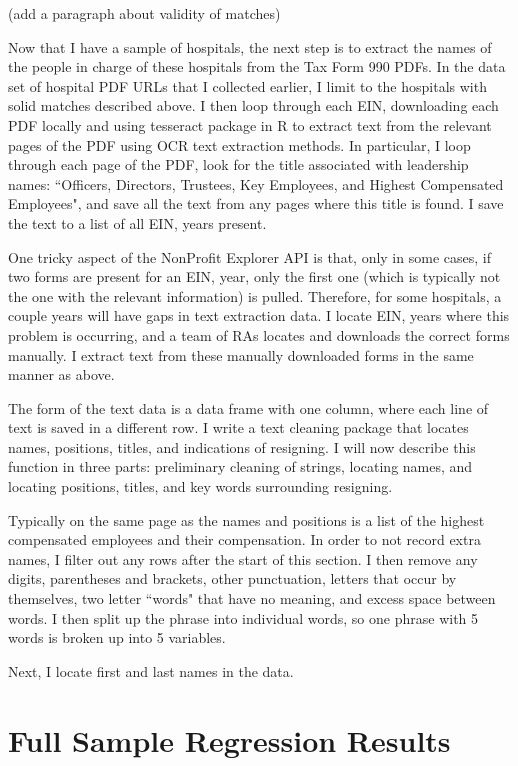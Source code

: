 \documentclass[12pt]{article}
\begin{document}
(add a paragraph about validity of matches)

 Now that I have a sample of hospitals, the next step is to extract the names of the people in charge of these hospitals from the Tax Form 990 PDFs. In the data set of hospital PDF URLs that I collected earlier, I limit to the hospitals with solid matches described above. I then loop through each EIN, downloading each PDF locally and using tesseract package in R to extract text from the relevant pages of the PDF using OCR text extraction methods. In particular, I loop through each page of the PDF, look for the title associated with leadership names: ``Officers, Directors, Trustees, Key Employees, and Highest Compensated Employees", and save all the text from any pages where this title is found. I save the text to a list of all EIN, years present. 

One tricky aspect of the NonProfit Explorer API is that, only in some cases, if two forms are present for an EIN, year, only the first one (which is typically not the one with the relevant information) is pulled. Therefore, for some hospitals, a couple years will have gaps in text extraction data. I locate EIN, years where this problem is occurring, and a team of RAs locates and downloads the correct forms manually. I extract text from these manually downloaded forms in the same manner as above. 

The form of the text data is a data frame with one column, where each line of text is saved in a different row. I write a text cleaning package that locates names, positions, titles, and indications of resigning. I will now describe this function in three parts: preliminary cleaning of strings, locating names, and locating positions, titles, and key words surrounding resigning. 

Typically on the same page as the names and positions is a list of the highest compensated employees and their compensation. In order to not record extra names, I filter out any rows after the start of this section. I then remove any digits, parentheses and brackets, other punctuation, letters that occur by themselves, two letter ``words" that have no meaning, and excess space between words. I then split up the phrase into individual words, so one phrase with 5 words is broken up into 5 variables. 

Next, I locate first and last names in the data. 


\section{Full Sample Regression Results}
\end{document}
